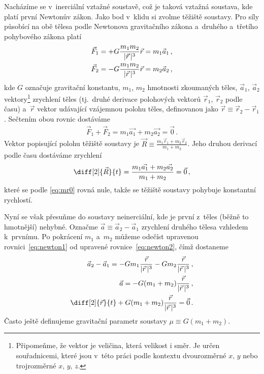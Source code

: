 \documentclass[A4paper, 12pt, oneside]{book}
\begin{document}
Nacházíme se v~inerciální vztažné soustavě, což je taková vztažná soustava, kde platí první Newtonův zákon. Jako bod v~klidu si zvolme těžiště soustavy. Pro síly působící na obě tělesa podle Newtonova gravitačního zákona a~druhého a~třetího pohybového zákona platí
\begin{align} 
	\vec{F}_1 &= +G\frac{m_1m_2}{\lvert \vec{r} \,\rvert^3}\vec{r} = m_1\vec{a}_1\,, \label{eq:newton1} \\
	\vec{F}_2 &= -G\frac{m_1m_2}{\lvert \vec{r} \,\rvert^3}\vec{r} = m_2\vec{a}_2\,, \label{eq:newton2}
\end{align}
kde $G$ označuje gravitační konstantu, $m_1$, $m_2$ hmotnosti zkoumaných těles, $\vec{a}_1$, $\vec{a}_2$ vektory\footnote{Připomeňme, že vektor je veličina, která velikost i směr. Je určen souřadnicemi, které jsou v~této práci podle kontextu dvourozměrné $x,\,y$ nebo trojrozměrné $x,\,y,\,z$.}  zrychlení těles (tj.\ druhé derivace polohových vektorů $\vec{r}_1$, $\vec{r}_2$ podle času) a~$\vec{r}$ vektor udávající vzájemnou polohu těles, definovanou jako $\vec{r} \equiv \vec{r}_2 - \vec{r}_1$. Sečtením obou rovnic dostáváme
\begin{align} \label{eq:mr0}
	\vec{F}_1 + \vec{F}_2 = m_1\vec{a_1} + m_2\vec{a_2} = \vec{0}\,.
\end{align}
Vektor popisující polohu těžiště soustavy je $\vec{R} \equiv \frac{m_1\vec{r}_1 + m_2\vec{r}_2}{m_1 + m_2}$. Jeho druhou derivací podle času dostáváme zrychlení
\begin{align}
	\diff[2]{\vec{R}}{t} = \frac{m_1\vec{a_1} + m_2\vec{a_2}}{m_1+m_2} = \vec{0}\,,
\end{align}
které se podle \eqref{eq:mr0} rovná nule, takže se těžiště soustavy pohybuje konstantní rychlostí.

Nyní se však přesuňme do soustavy neinerciální, kde je první z~těles (běžně to hmotnější) nehybné. Označme $\vec{a}\equiv\vec{a}_2-\vec{a}_1$ zrychlení druhého tělesa vzhledem k~prvnímu. Po pokrácení $m_1$ a~$m_2$ můžeme odečíst upravenou rovnici~\eqref{eq:newton1} od upravené rovnice~\eqref{eq:newton2}, čímž dostaneme
\begin{align}
	\nonumber \vec{a}_2 - \vec{a}_1 = -Gm_1\frac{\vec{r}}{\abs{\vec{r}}^3}-Gm_2\frac{\vec{r}}{\abs{\vec{r}}^3}\,, \\
	\nonumber \vec{a} = -G(m_1+m_2)\frac{\vec{r}}{\abs{\vec{r}}^3}\,, \\
		\diff[2]{\vec{r}}{t} + G(m_1+m_2)\frac{\vec{r}}{\abs{\vec{r}}^3} = \vec{0}\,. \label{eq:eqmotion}
\end{align}
Často ještě definujeme gravitační parametr soustavy $\mu\equiv G(m_1+m_2)$.
\end{document}

